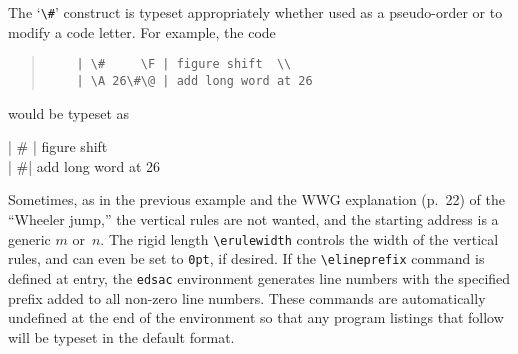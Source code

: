 \documentclass[letterpaper,11pt]{article}
\newcommand{\hang}{\leftskip=1em\parindent=-1em}
\begin{document}
The `\verb"\#"' construct is typeset appropriately whether used as a
pseudo-order or to modify a code letter.  For example, the code
\begin{quote}\small
\begin{verbatim}
    | \#     \F | figure shift  \\
    | \A 26\#\@ | add long word at 26
\end{verbatim}
\end{quote}
would be typeset as
\bgroup\setlength{\erulewidth}{0pt}
\begin{edsac}{0}
\nonum  | \#     \F | figure shift  \\
\nonum  | \#\@ | add long word at 26
\end{edsac}
\egroup

Sometimes, as in the previous example and
the WWG explanation (p.~22) of the ``Wheeler jump,'' the
vertical rules are not wanted, and the starting address is a generic
$m$ or~$n$.
The rigid length \verb"\erulewidth" controls the width of the vertical
rules, and can even be set to \verb"0pt", if desired.
If the \verb"\elineprefix" command is defined at entry, the
\texttt{edsac} environment generates line numbers with the specified
prefix added to all non-zero line numbers.  These commands are
automatically undefined at the end of the environment so that
any program listings that follow will be typeset in the default format.
\bgroup\setlength{\erulewidth}{0pt}
\newcommand{\startloc}{m}
\newcommand{\elineprefix}{\ensuremath{\startloc}}
\egroup
\end{document}
